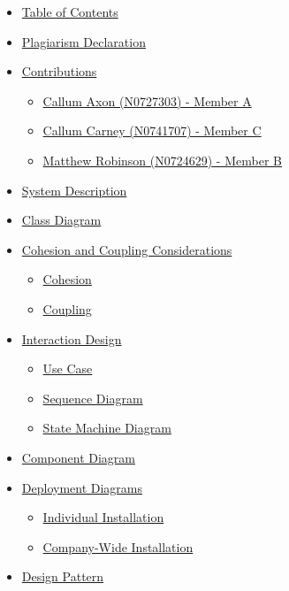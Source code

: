 \documentclass[
  english,
  a4paper,
,tablecaptionabove
]{scrartcl}
\providecommand{\tightlist}{%
  \setlength{\itemsep}{0pt}\setlength{\parskip}{0pt}}
\begin{document}
\begin{itemize}
\tightlist
\item
  \protect\hyperlink{table-of-contents}{Table of Contents}
\item
  \protect\hyperlink{plagiarism-declaration}{Plagiarism Declaration}
\item
  \protect\hyperlink{contributions}{Contributions}

  \begin{itemize}
  \tightlist
  \item
    \protect\hyperlink{callum-axon-n0727303---member-a}{Callum Axon
    (N0727303) - Member A}
  \item
    \protect\hyperlink{callum-carney-n0741707---member-c}{Callum Carney
    (N0741707) - Member C}
  \item
    \protect\hyperlink{matthew-robinson-n0724629---member-b}{Matthew
    Robinson (N0724629) - Member B}
  \end{itemize}
\item
  \protect\hyperlink{system-description}{System Description}
\item
  \protect\hyperlink{class-diagram}{Class Diagram}
\item
  \protect\hyperlink{cohesion-and-coupling-considerations}{Cohesion and
  Coupling Considerations}

  \begin{itemize}
  \tightlist
  \item
    \protect\hyperlink{cohesion}{Cohesion}
  \item
    \protect\hyperlink{coupling}{Coupling}
  \end{itemize}
\item
  \protect\hyperlink{interaction-design}{Interaction Design}

  \begin{itemize}
  \tightlist
  \item
    \protect\hyperlink{use-case}{Use Case}
  \item
    \protect\hyperlink{sequence-diagram}{Sequence Diagram}
  \item
    \protect\hyperlink{state-machine-diagram}{State Machine Diagram}
  \end{itemize}
\item
  \protect\hyperlink{component-diagram}{Component Diagram}
\item
  \protect\hyperlink{deployment-diagrams}{Deployment Diagrams}

  \begin{itemize}
  \tightlist
  \item
    \protect\hyperlink{individual-installation}{Individual Installation}
  \item
    \protect\hyperlink{company-wide-installation}{Company-Wide
    Installation}
  \end{itemize}
\item
  \protect\hyperlink{design-pattern}{Design Pattern}


\end{itemize}
\end{document}
